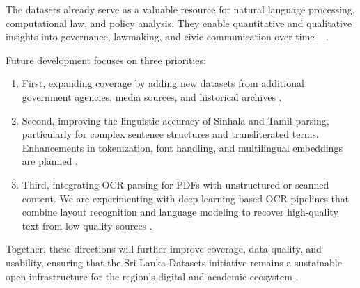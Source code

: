 \documentclass[10pt,a4paper]{article}%
\begin{document}
%
The datasets already serve as a valuable
 resource for natural language processing,
 computational law, and policy analysis. They
 enable quantitative and qualitative insights
 into governance, lawmaking, and civic
 communication over time%
~%
\citep{FAIRPrinciples2016}%
.%

%
Future development focuses on three priorities:%

%
\begin{enumerate}%

%
\item First, expanding coverage by adding new datasets from additional government agencies, media sources, and historical archives .%

%
\item Second, improving the linguistic accuracy of Sinhala and Tamil parsing, particularly for complex sentence structures and transliterated terms. Enhancements in tokenization, font handling, and multilingual embeddings are planned .%

%
\item Third, integrating OCR parsing for PDFs with unstructured or scanned content. We are experimenting with deep-learning-based OCR pipelines that combine layout recognition and language modeling to recover high-quality text from low-quality sources .%

%
\end{enumerate}%

%
Together, these directions will further improve coverage, data quality, and usability, ensuring that the Sri Lanka Datasets initiative remains a sustainable open infrastructure for the region’s digital and academic ecosystem .%

%
%
%
\end{document}

